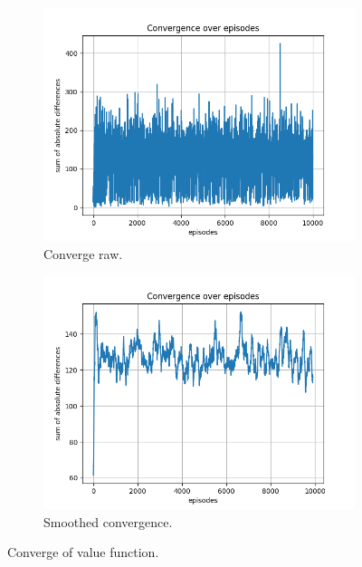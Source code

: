 \documentclass{assignment}
\begin{document}
\begin{figure}[H]
    \begin{subfigure}{0.5\textwidth}
        \includegraphics[width=\textwidth]{figures/convergence_q/alpha_sweep/convergence_Q_alpha_1_gamma_0.95_epislon_0.2.png}
    \caption{Converge raw.}
    \end{subfigure}\hfill
    \begin{subfigure}{0.5\textwidth}
        \includegraphics[width=\textwidth]{figures/convergence_q/alpha_sweep/convergence_Q_smoothed_alpha_1_gamma_0.95_epislon_0.2.png}
    \caption{Smoothed convergence.}
    \end{subfigure}
    \caption{Converge of value function.}
    \label{fig:alpha_1_q_learning_convergence}
\end{figure}
\end{document}
